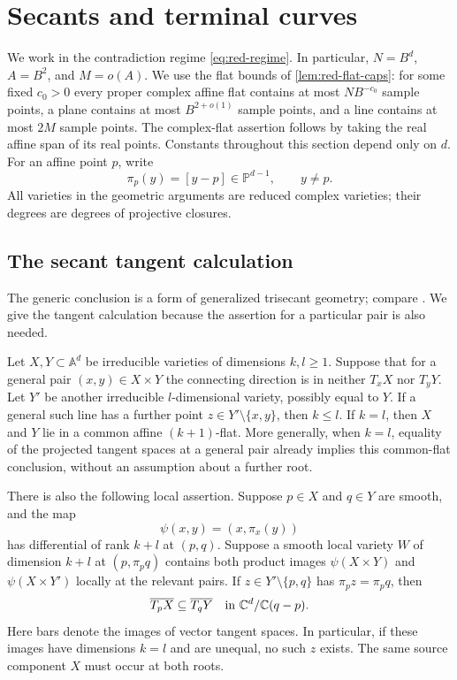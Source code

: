\section{Secants and terminal curves}\label{sec:geo-section}

We work in the contradiction regime \eqref{eq:red-regime}. In particular, $N=B^d$, $A=B^2$, and $M=o(A)$. We use the flat bounds of \cref{lem:red-flat-caps}: for some fixed $c_0>0$ every proper complex affine flat contains at most $NB^{-c_0}$ sample points, a plane contains at most $B^{2+o(1)}$ sample points, and a line contains at most $2M$ sample points. The complex-flat assertion follows by taking the real affine span of its real points. Constants throughout this section depend only on $d$. For an affine point $p$, write
\[
 \pi_p(y)=[y-p]\in\mathbb{P}^{d-1},\qquad y\ne p.
\]
All varieties in the geometric arguments are reduced complex varieties; their degrees are degrees of projective closures.

\subsection{The secant tangent calculation}

The generic conclusion is a form of generalized trisecant geometry; compare \cite[Section~3.2]{kaminskikanelbelovteicher2008}.  We give the tangent calculation because the assertion for a particular pair is also needed.

\begin{lemma}\label{lem:geo-secants}
Let $X,Y\subset\mathbb{A}^d$ be irreducible varieties of dimensions $k,l\ge1$. Suppose that for a general pair $(x,y)\in X\times Y$ the connecting direction is in neither $T_xX$ nor $T_yY$. Let $Y'$ be another irreducible $l$-dimensional variety, possibly equal to $Y$. If a general such line has a further point $z\in Y'\setminus\{x,y\}$, then $k\le l$. If $k=l$, then $X$ and $Y$ lie in a common affine $(k+1)$-flat. More generally, when $k=l$, equality of the projected tangent spaces at a general pair already implies this common-flat conclusion, without an assumption about a further root.

There is also the following local assertion. Suppose $p\in X$ and $q\in Y$ are smooth, and the map
\[
 \psi(x,y)=(x,\pi_x(y))
\]
has differential of rank $k+l$ at $(p,q)$. Suppose a smooth local variety $W$ of dimension $k+l$ at $(p,\pi_pq)$ contains both product images $\psi(X\times Y)$ and $\psi(X\times Y')$ locally at the relevant pairs. If $z\in Y'\setminus\{p,q\}$ has $\pi_pz=\pi_pq$, then
\begin{equation}
 \overline{T_pX}\subseteq\overline{T_qY}
 \quad\hbox{in }\mathbb{C}^d/\mathbb{C}(q-p).
 \label{eq:secant-tangent-inclusion}
\end{equation}
Here bars denote the images of vector tangent spaces. In particular, if these images have dimensions $k=l$ and are unequal, no such $z$ exists. The same source component $X$ must occur at both roots.
\end{lemma}

